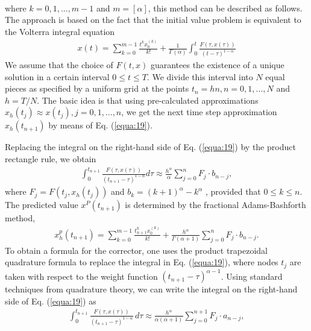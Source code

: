 \documentclass[10pt]{article}
\begin{document}
\begin{multicols}{2}
\begin{align}
        \end{align}
        where $k = 0, 1, . . . , m - 1$ and $m = [\alpha]$, this method can be described as follows. The approach is based on the fact that the initial value problem is equivalent to the Volterra integral equation
        \begin{align}
            x(t) = \sum_{k=0}^{m-1} \frac{t^k x_0^{(k)}}{k!} + \frac{1}{\Gamma (\alpha)} \int_0^t \frac{F(\tau , x(\tau))}{(t- \tau)^{1-\alpha}} \label{equa:19}
        \end{align}
        We assume that the choice of $F(t, x)$ guarantees the existence of a unique solution in a certain interval $0 \le t \le T$. We divide this interval into $N$ equal pieces as specified by a uniform grid at the points $t_n = hn, n = 0, 1, . . . , N$ and $h = T / N$. The basic idea is that using pre-calculated approximations $x_h(t_j ) \approx x(t_j ), j = 0, 1, . . . , n$, we get the next time step approximation $x_h(t_{n+1})$ by means of Eq. (\ref{equa:19}). \par
        Replacing the integral on the right-hand side of Eq. (\ref{equa:19}) by the product rectangle rule, we obtain
        \begin{align}
            \int_0^{t_{n+1}} \frac{F(\tau , x(\tau))}{(t_{n+1}-\tau)^{1-\alpha}}d\tau \approx \frac{h^\alpha}{\alpha} \sum_{j=0}^n F_j \cdot b_{n-j}, \label{equa:20}
        \end{align}
        where $F_j = F(t_j , x_h(t_j))$ and $b_k = (k + 1)^\alpha - k^\alpha$ , provided that $0 \le k \le n$. The predicted value $x^P (t_{n+1})$ is determined by the fractional Adams-Bashforth method,
        \begin{align}
            x_h^p (t_{n+1}) = \sum_{k=0}^{m-1} \frac{t_{n+1}^k x_0^{(k)}}{k!} + \frac{h^\alpha}{\Gamma (\alpha + 1)} \sum_{j=0}^n F_j \cdot b_{n-j}. \label{equa:21}
        \end{align}
        To obtain a formula for the corrector, one uses the product trapezoidal quadrature formula to replace the integral in Eq. (\ref{equa:19}), where nodes $t_j$ are taken with respect to the weight function $(t_{n+1} - \tau)^{\alpha - 1}$. Using standard techniques from quadrature theory, we can write the integral on the right-hand side of Eq. (\ref{equa:19}) as
        \begin{align}
            \int_0^{t_{n+1}} \frac{F(\tau,x(\tau))}{(t_{n+1}-\tau)^{1-\alpha}}\,d\tau \approx \frac{h^\alpha}{\alpha(\alpha + 1)} \sum_{j=0}^{n+1} F_j \cdot a_{n-j}, \label{equa:22}
        \end{align}

\end{multicols}
\end{document}
